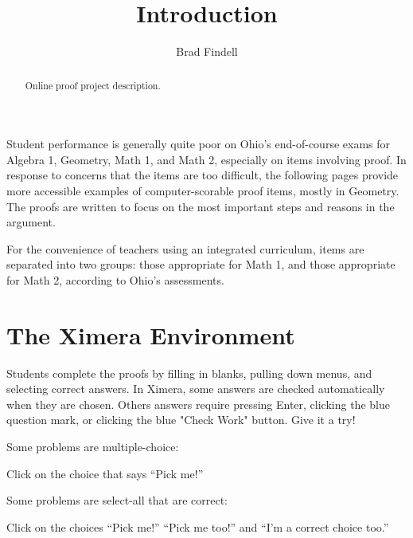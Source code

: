\documentclass[nooutcomes]{ximera}
\title{Introduction}
\author{Brad Findell}
\begin{document}
\begin{abstract}
Online proof project description. 
\end{abstract}
\maketitle

Student performance is generally quite poor on Ohio's end-of-course exams for Algebra 1, Geometry, Math 1, and Math 2, especially on items involving proof.  In response to concerns that the items are too difficult, the following pages provide more accessible examples of computer-scorable proof items, mostly in Geometry.  The proofs are written to focus on the most important steps and reasons in the argument.  

For the convenience of teachers using an integrated curriculum, items are separated into two groups: those appropriate for Math 1, and those appropriate for Math 2, according to Ohio's assessments.  

\section{The Ximera Environment}
Students complete the proofs by filling in blanks, pulling down menus, and selecting correct answers.  
In Ximera, some answers are checked automatically when they are chosen.  Others answers require pressing Enter, clicking the blue question mark, or clicking the blue "Check Work" button. Give it a try!  

\begin{example}
  Some problems are multiple-choice:
  \begin{multipleChoice}
  \end{multipleChoice}
  \begin{feedback}
    Click on the choice that says ``Pick me!''
  \end{feedback}
\end{example}


\begin{example}
  Some problems are select-all that are correct:
  \begin{selectAll}
  \end{selectAll}
  \begin{feedback}
    Click on the choices ``Pick me!'' ``Pick me too!'' and ``I'm a correct choice too.''
  \end{feedback}
\end{example}
\end{document}
